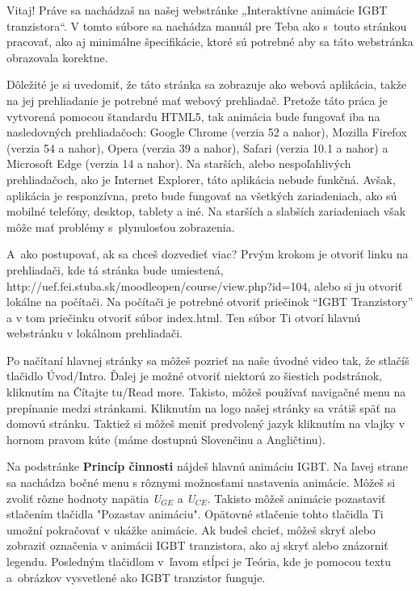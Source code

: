 Vitaj! Práve sa nachádzaš na našej webstránke „Interaktívne animácie IGBT tranzistora“. V tomto súbore sa nachádza manuál pre Teba ako s touto stránkou pracovať, ako aj minimálne špecifikácie, ktoré sú potrebné aby sa táto webstránka obrazovala korektne.

Dôležité je si uvedomiť, že táto stránka sa zobrazuje ako webová aplikácia, takže na jej prehliadanie je potrebné mať webový prehliadač. Pretože táto práca je vytvorená pomocou štandardu HTML5, tak animácia bude fungovať iba na nasledovných prehliadačoch: Google Chrome (verzia 52 a nahor), Mozilla Firefox (verzia 54 a nahor), Opera (verzia 39 a nahor), Safari (verzia 10.1 a nahor) a Microsoft Edge (verzia 14 a nahor). Na starších, alebo nespoľahlivých prehliadačoch, ako je Internet Explorer, táto aplikácia nebude funkčná. Avšak, aplikácia je responzívna, preto bude fungovať na všetkých zariadeniach, ako sú mobilné telefóny, desktop, tablety a iné. Na starších a slabších zariadeniach však môže mať problémy s plynulosťou zobrazenia. 

A ako postupovať, ak sa chceš dozvedieť viac? Prvým krokom je otvoriť linku na prehliadači, kde tá stránka bude umiestená, http://uef.fei.stuba.sk/moodleopen/course/view.php?id=104, 
alebo si ju otvoriť lokálne na počítači. Na počítači je potrebné otvoriť priečinok “IGBT Tranzistory” a v tom priečinku otvoriť súbor index.html. Ten súbor Ti otvorí hlavnú webstránku v lokálnom prehliadači. 

Po načítaní hlavnej stránky sa môžeš pozrieť na naše úvodné video tak, že stlačíš tlačidlo Úvod/Intro. Ďalej je možné otvoriť niektorú zo šiestich podstránok, kliknutím na Čítajte tu/Read more. Takisto, môžeš používať navigačné menu na prepínanie medzi stránkami. Kliknutím na logo našej stránky sa vrátiš späť na domovú stránku. Taktiež si môžeš meniť predvolený jazyk kliknutím na vlajky v hornom pravom kúte (máme dostupnú Slovenčinu a Angličtinu). 

Na podstránke \textbf{Princíp činnosti} nájdeš hlavnú animáciu IGBT. Na ľavej strane sa nachádza bočné menu s rôznymi možnosťami nastavenia animácie. Môžeš si zvoliť rôzne hodnoty napätia \textit{U}$_{GE}$ a \textit{U}$_{CE}$. Takisto môžeš animácie pozastaviť stlačením tlačidla "Pozastav animáciu". Opätovné stlačenie tohto tlačidla Ti umožní pokračovať v ukážke animácie. Ak budeš chcieť, môžeš skryť alebo zobraziť označenia v animácii IGBT tranzistora, ako aj skryť alebo znázorniť legendu. Posledným tlačidlom v ľavom stĺpci je Teória, kde je pomocou textu a obrázkov vysvetlené ako IGBT tranzistor funguje. 

